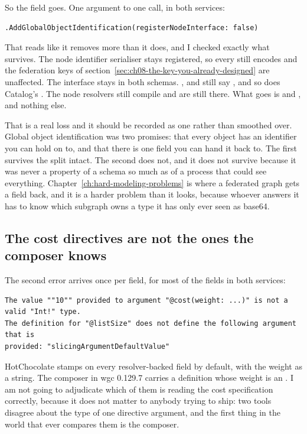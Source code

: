 So the field goes. One argument to one call, in both services:

\begin{verbatim}
.AddGlobalObjectIdentification(registerNodeInterface: false)
\end{verbatim}

That reads like it removes more than it does, and I checked exactly what
survives. The node identifier serialiser stays registered, so every \code{[ID]}
still encodes and the federation keys of
section~\ref{sec:ch08-the-key-you-already-designed} are unaffected. The
 interface stays in both schemas. ,  and
 still say , and so does Catalog's
. The node resolvers still compile and are still there. What goes
is  and , and nothing else.

%
That is a real loss and it should be recorded as one rather than smoothed over.
Global object identification was two promises: that every object has an
identifier you can hold on to, and that there is one field you can hand it back
to. The first survives the split intact. The second does not, and it does not
survive because it was never a property of a schema so much as of a process that
could see everything. Chapter~\ref{ch:hard-modeling-problems} is where a
federated graph gets a  field back, and it is a harder problem than
it looks, because whoever answers it has to know which subgraph owns a type it
has only ever seen as base64.

\subsection*{The cost directives are not the ones the composer knows}

%
The second error arrives once per field, for most of the fields in both
services:

\begin{verbatim}
The value ""10"" provided to argument "@cost(weight: ...)" is not a valid "Int!" type.
The definition for "@listSize" does not define the following argument that is
provided: "slicingArgumentDefaultValue"
\end{verbatim}

HotChocolate stamps  on every resolver-backed field by
default, with the weight as a string. The composer in wgc 0.129.7 carries a
definition whose weight is an . I am not going to adjudicate which of
them is reading the cost specification correctly, because it does not matter to
anybody trying to ship: two tools disagree about the type of one directive
argument, and the first thing in the world that ever compares them is the
composer.

